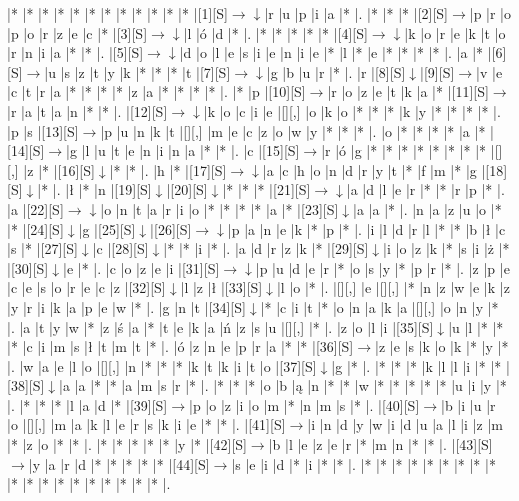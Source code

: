 \documentclass[11pt]{article}
\newcommand\drarr{$\rightarrow \!\!\!\!\! \downarrow$}
\newcommand\rarr{$\rightarrow$}
\newcommand\darr{$\downarrow$}
\begin{document}
\noindent\begin{Puzzle}{18}{32}|*	|*	|*	|*	|*	|*	|*	|*	|*	|*	|*	|*	|[1][S]\drarr	|r	|u	|p	|i	|a	|*	|.
|*	|*	|*	|[2][S]\rarr	|p	|r	|o	|p	|o	|r	|z	|e	|c	|*	|[3][S]\drarr	|l	|ó	|d	|*	|.
|*	|*	|*	|*	|*	|[4][S]\drarr	|k	|o	|r	|e	|k	|t	|o	|r	|n	|i	|a	|*	|*	|.
|[5][S]\drarr	|d	|o	|l	|e	|s	|i	|e	|n	|i	|e	|*	|l	|*	|e	|*	|*	|*	|*	|.
|a	|*	|[6][S]\rarr	|u	|s	|z	|t	|y	|k	|*	|*	|*	|t	|[7][S]\drarr	|g	|b	|u	|r	|*	|.
|r	|[8][S]\darr	|[9][S]\rarr	|v	|e	|c	|t	|r	|a	|*	|*	|*	|*	|z	|a	|*	|*	|*	|*	|.
|*	|p	|[10][S]\rarr	|r	|o	|z	|e	|t	|k	|a	|*	|[11][S]\rarr	|r	|a	|t	|a	|n	|*	|*	|.
|[12][S]\drarr	|k	|o	|c	|i	|e	|[][,]{ }	|o	|k	|o	|*	|*	|*	|k	|y	|*	|*	|*	|*	|.
|p	|s	|[13][S]\rarr	|p	|u	|n	|k	|t	|[][,]{ }	|m	|e	|c	|z	|o	|w	|y	|*	|*	|*	|.
|o	|*	|*	|*	|*	|a	|*	|[14][S]\rarr	|g	|l	|u	|t	|e	|n	|i	|n	|a	|*	|*	|.
|c	|[15][S]\rarr	|r	|ó	|g	|*	|*	|*	|*	|*	|*	|*	|*	|[][,]{ }	|z	|*	|[16][S]\darr	|*	|*	|.
|h	|*	|[17][S]\drarr	|a	|c	|h	|o	|n	|d	|r	|y	|t	|*	|f	|m	|*	|g	|[18][S]\darr	|*	|.
|ł	|*	|n	|[19][S]\darr	|[20][S]\darr	|*	|*	|*	|[21][S]\drarr	|a	|d	|l	|e	|r	|*	|*	|r	|p	|*	|.
|a	|[22][S]\drarr	|o	|n	|t	|a	|r	|i	|o	|*	|*	|*	|*	|a	|*	|[23][S]\darr	|a	|a	|*	|.
|n	|a	|z	|u	|o	|*	|*	|[24][S]\darr	|g	|[25][S]\darr	|[26][S]\drarr	|p	|a	|n	|e	|k	|*	|p	|*	|.
|i	|l	|d	|r	|l	|*	|*	|b	|ł	|c	|s	|*	|[27][S]\darr	|c	|[28][S]\darr	|*	|*	|i	|*	|.
|a	|d	|r	|z	|k	|*	|[29][S]\darr	|i	|o	|z	|k	|*	|s	|i	|ż	|*	|[30][S]\darr	|e	|*	|.
|c	|o	|z	|e	|i	|[31][S]\drarr	|p	|u	|d	|e	|r	|*	|o	|s	|y	|*	|p	|r	|*	|.
|z	|p	|e	|c	|e	|s	|o	|r	|e	|c	|z	|[32][S]\darr	|l	|z	|ł	|[33][S]\darr	|l	|o	|*	|.
|[][,]{ }	|e	|[][,]{ }	|*	|n	|z	|w	|e	|k	|z	|y	|r	|i	|k	|a	|p	|e	|w	|*	|.
|g	|n	|t	|[34][S]\darr	|*	|c	|i	|t	|*	|o	|n	|a	|k	|a	|[][,]{ }	|o	|n	|y	|*	|.
|a	|t	|y	|w	|*	|z	|ś	|a	|*	|t	|e	|k	|a	|ń	|z	|s	|u	|[][,]{ }	|*	|.
|z	|o	|l	|i	|[35][S]\darr	|u	|l	|*	|*	|*	|c	|i	|m	|s	|ł	|t	|m	|t	|*	|.
|ó	|z	|n	|e	|p	|r	|a	|*	|*	|[36][S]\rarr	|z	|e	|s	|k	|o	|k	|*	|y	|*	|.
|w	|a	|e	|l	|o	|[][,]{ }	|n	|*	|*	|*	|k	|t	|k	|i	|t	|o	|[37][S]\darr	|g	|*	|.
|*	|*	|*	|k	|l	|l	|i	|*	|*	|[38][S]\darr	|a	|a	|*	|*	|a	|m	|s	|r	|*	|.
|*	|*	|*	|o	|b	|ą	|n	|*	|*	|w	|*	|*	|*	|*	|*	|u	|i	|y	|*	|.
|*	|*	|*	|l	|a	|d	|*	|[39][S]\rarr	|p	|o	|z	|i	|o	|m	|*	|n	|m	|s	|*	|.
|[40][S]\rarr	|b	|i	|u	|r	|o	|[][,]{ }	|m	|a	|k	|l	|e	|r	|s	|k	|i	|e	|*	|*	|.
|[41][S]\rarr	|i	|n	|d	|y	|w	|i	|d	|u	|a	|l	|i	|z	|m	|*	|z	|o	|*	|*	|.
|*	|*	|*	|*	|*	|y	|*	|[42][S]\rarr	|b	|l	|e	|z	|e	|r	|*	|m	|n	|*	|*	|.
|[43][S]\rarr	|y	|a	|r	|d	|*	|*	|*	|*	|*	|[44][S]\rarr	|s	|e	|i	|d	|*	|i	|*	|*	|.
|*	|*	|*	|*	|*	|*	|*	|*	|*	|*	|*	|*	|*	|*	|*	|*	|*	|*	|*	|.\end{Puzzle}
\end{document}
